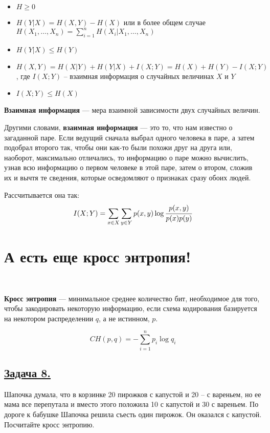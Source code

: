 \begin{itemize}
    \item $H \geqslant 0$
    \item $H(Y|X)=H(X, Y)-H(X)$ или в более общем случае $H(X_1, \ldots, X_n)=\sum\limits_{i=1}^n H(X_i|X_1, \ldots, X_n)$
    \item $H(Y|X)\leqslant H(Y)$
    \item $H(X, Y)=H(X|Y)+H(Y|X)+I(X; Y)=H(X)+H(Y)-I(X; Y)$, где $I(X; Y)$ -- взаимная информация о случайных величинах $X$ и $Y$
    \item $I(X; Y)\leqslant H(X)$
\end{itemize}

\begin{siderules}
    \textbf{Взаимная информация} --- мера взаимной зависимости двух случайных величин.
\end{siderules}

Другими словами, \textbf{взаимная информация} --- это то, что нам известно о загаданной паре. Если ведущий сначала выбрал одного человека в паре, а затем подобрал второго так, чтобы они как-то были похожи друг на друга или, наоборот, максимально отличались, то информацию о паре можно вычислить, узнав всю информацию о первом человеке в этой паре, затем о втором, сложив их и вычтя те сведения, которые осведомляют о признаках сразу обоих людей.

Рассчитывается она так:
\[I(X; Y)=\sum\limits_{x\in X}\sum\limits_{y\in Y} p(x, y)\log \cfrac{p(x, y)}{p(x)p(y)} \]

\section*{А есть еще кросс энтропия!}~\
\\

\begin{siderules}
    \textbf{Кросс энтропия} --- минимальное среднее количество бит, необходимое для того, чтобы закодировать некоторую информацию, если схема кодирования базируется на некотором распределении $q$, а не истинном, $p$.
\end{siderules}

\[CH(p, q)=-\sum\limits_{i=1}^{n}p_i\log q_i \]

\subsection*{\hyperref[sec:sol_problem8]{Задача 8.}}\label{sec:problem8} Шапочка думала, что в корзинке 20 пирожков с капустой и 20 – с вареньем, но ее мама все перепутала и вместо этого положила 10 с капустой и 30 с вареньем. По дороге к бабушке Шапочка решила съесть один пирожок. Он оказался с капустой. Посчитайте кросс энтропию.\\


